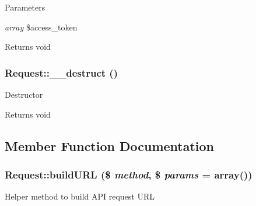 \begin{DoxyParams}{Parameters}
\item[{\em array}]\$access\_\-token \end{DoxyParams}
\begin{DoxyReturn}{Returns}
void 
\end{DoxyReturn}
\hypertarget{classRequest_abc025f3077005e6d01bd4619576e21ee}{
\subsubsection[{\_\-\_\-destruct}]{\setlength{\rightskip}{0pt plus 5cm}Request::\_\-\_\-destruct ()}}
\label{classRequest_abc025f3077005e6d01bd4619576e21ee}
Destructor

\begin{DoxyReturn}{Returns}
void 
\end{DoxyReturn}


\subsection{Member Function Documentation}
\hypertarget{classRequest_ac595eebf6edfe423a31bee75bee2005e}{
\subsubsection[{buildURL}]{\setlength{\rightskip}{0pt plus 5cm}Request::buildURL (\$ {\em method}, \/  \$ {\em params} = {\ttfamily array()})}}
\label{classRequest_ac595eebf6edfe423a31bee75bee2005e}
Helper method to build API request URL


